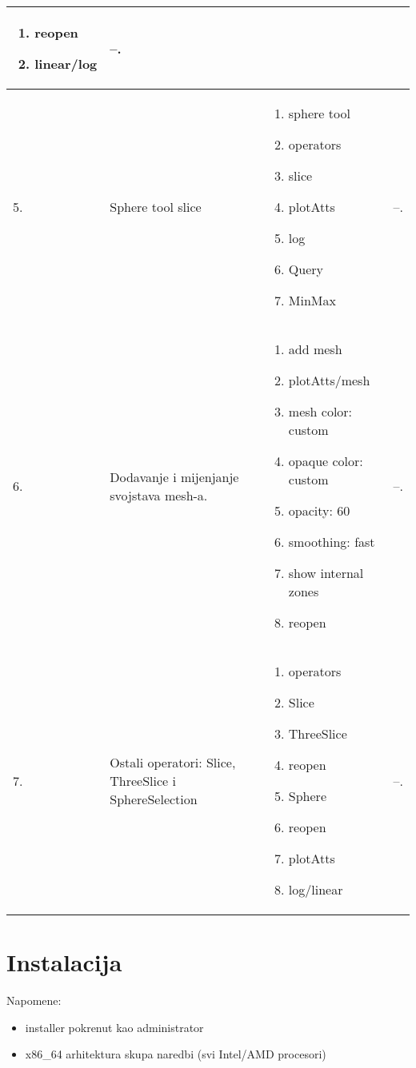 \documentclass[times, utf8, zavrsni]{fer}
\begin{document}
\begin{longtable}{|l|p{80pt}|p{100pt}|p{120pt}|}
\begin{enumerate}
    \item reopen
    \item linear/log
\end{enumerate}
& --.\\
\hline
5. & Sphere tool slice & \begin{enumerate}
	\item sphere tool    
    \item operators
    \item slice
    \item plotAtts
    \item log
    \item Query
    \item MinMax
\end{enumerate}
& --.\\
\hline
6. & Dodavanje i mijenjanje svojstava mesh-a. & \begin{enumerate}
	\item add mesh
	\item plotAtts/mesh
	\item mesh color: custom
	\item opaque color: custom
	\item opacity: 60%
	\item smoothing: fast
	\item show internal zones
	\item reopen
\end{enumerate}
& --.\\
\hline
7. & Ostali operatori: Slice, ThreeSlice i SphereSelection & \begin{enumerate}
	\item operators
	\item Slice
	\item ThreeSlice
	\item reopen
	\item Sphere
	\item reopen
	\item plotAtts
	\item log/linear
\end{enumerate}
& --.\\
\hline
\end{longtable}
	


\chapter{Instalacija}
Napomene:
\begin{itemize}
	\item installer pokrenut kao administrator
	\item x86_64 arhitektura skupa naredbi (svi Intel/AMD procesori)
\end{itemize}
\end{document}
